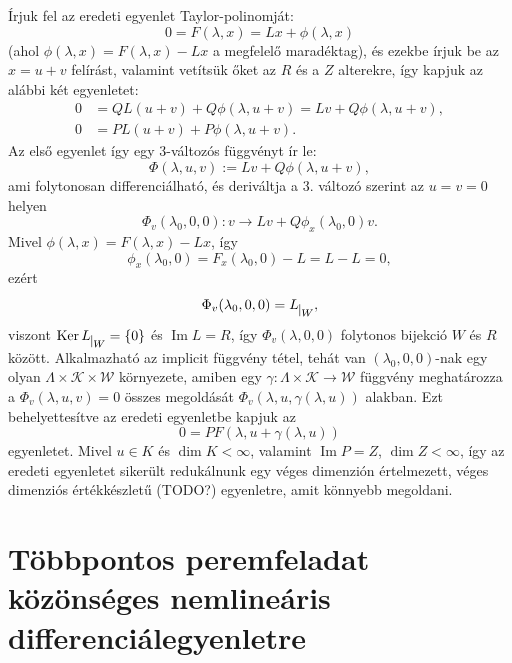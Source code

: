 \documentclass[oneside, titlepage, 12pt, a4paper]{report}
\DeclareMathOperator{\Ima}{Im}	%
\DeclareMathOperator{\Ker}{Ker}	%
\begin{document}
Írjuk fel az eredeti egyenlet Taylor-polinomját:
\begin{equation*}
0 = F(\lambda, x) = Lx + \phi (\lambda, x)
\end{equation*}
(ahol $\phi(\lambda, x) = F(\lambda, x) - Lx$ a megfelelő maradéktag), és ezekbe írjuk be az $x = u + v$ felírást, valamint vetítsük őket az $R$ és a $Z$ alterekre, így kapjuk az alábbi két egyenletet:
\begin{align*}
0 &= QL(u + v) + Q\phi (\lambda, u + v) = Lv + Q\phi (\lambda, u + v), \\
0 &= PL(u + v) + P\phi (\lambda, u + v).
\end{align*}
Az első egyenlet így egy 3-változós függvényt ír le:
\begin{equation*}
\Phi(\lambda, u, v) := Lv + Q\phi (\lambda, u + v),
\end{equation*}
ami folytonosan differenciálható, és deriváltja a 3. változó szerint az $u = v = 0$ helyen
\begin{equation*}
\Phi_v (\lambda_0, 0, 0) : v \rightarrow Lv + Q\phi_x(\lambda_0, 0)v.
\end{equation*}
Mivel $\phi(\lambda, x) = F(\lambda, x) - Lx$, így
\begin{equation*}
\phi_x(\lambda_0, 0) = F_x(\lambda_0, 0) - L = L - L = 0,
\end{equation*}
ezért
\begin{equation*}
\Phi_v (\lambda_0, 0, 0) = L_{\mkern 1mu \vrule height 2ex\mkern2mu W},
\end{equation*}
viszont $\Ker L_{\mkern 1mu \vrule height 2ex\mkern2mu W} = \{0\}$ és $\Ima L = R$, így $\Phi_v (\lambda, 0, 0)$ folytonos bijekció $W$ és $R$ között. Alkalmazható az implicit függvény tétel, tehát van $(\lambda_0, 0, 0)$-nak egy olyan $\Lambda \times \mathcal{K} \times \mathcal{W}$ környezete, amiben egy $\gamma : \Lambda \times \mathcal{K} \rightarrow \mathcal{W}$ függvény meghatározza a $\Phi_v (\lambda, u, v) = 0$ összes megoldását $\Phi_v (\lambda, u, \gamma(\lambda, u))$ alakban.
Ezt behelyettesítve az eredeti egyenletbe kapjuk az
\begin{equation*}
0 = P F(\lambda, u + \gamma(\lambda, u))
\end{equation*}
egyenletet. Mivel $u \in K$ és $\dim K < \infty$, valamint $\Ima P = Z$, $\dim Z < \infty$, így az eredeti egyenletet sikerült redukálnunk egy véges dimenzión értelmezett, véges dimenziós értékkészletű (TODO?) egyenletre, amit könnyebb megoldani.

\section{Többpontos peremfeladat közönséges nemlineáris differenciálegyenletre}
\label{sec:multipoint}
\end{document}
